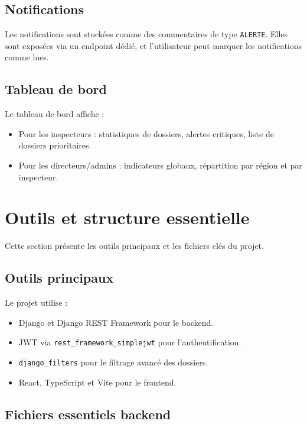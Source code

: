 \documentclass[12pt,a4paper]{article}
\begin{document}
\subsection{Notifications}
Les notifications sont stockées comme des commentaires de type \texttt{ALERTE}. Elles sont exposées via un endpoint dédié, et l'utilisateur peut marquer les notifications comme lues.

\subsection{Tableau de bord}
Le tableau de bord affiche :
\begin{itemize}
    \item Pour les inspecteurs : statistiques de dossiers, alertes critiques, liste de dossiers prioritaires.
    \item Pour les directeurs/admins : indicateurs globaux, répartition par région et par inspecteur.
\end{itemize}

\section{Outils et structure essentielle}

Cette section présente les outils principaux et les fichiers clés du projet.

\subsection{Outils principaux}

Le projet utilise :
\begin{itemize}
    \item Django et Django REST Framework pour le backend.
    \item JWT via \texttt{rest_framework_simplejwt} pour l'authentification.
    \item \texttt{django_filters} pour le filtrage avancé des dossiers.
    \item React, TypeScript et Vite pour le frontend.
\end{itemize}

\subsection{Fichiers essentiels backend}
\end{document}
